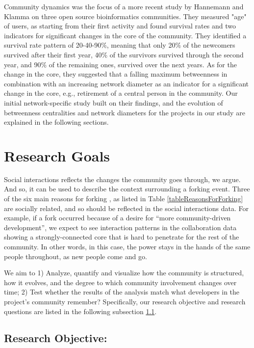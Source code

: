 \documentclass{acm_proc_article-sp}
\begin{document}
Community dynamics was the focus of a more recent study by Hannemann and Klamma \cite{Hannemann} on three open source bioinformatics communities. They measured "age" of users, as starting from their first activity and found survival rates and two indicators for significant changes in the core of the community. They identified a survival rate pattern of 20-40-90\%, meaning that only 20\% of the newcomers survived after their first year, 40\% of the survivors survived through the second year, and 90\% of the remaining ones, survived over the next years. As for the change in the core, they suggested that a falling maximum betweenness in combination with an increasing network diameter as an indicator for a significant change in the core, e.g., retirement of a central person in the community. Our initial network-specific study built on their findings, and the evolution of betweenness centralities and network diameters for the projects in our study are explained in the following sections.


\section{Research Goals}
\label{ResearchGoals}

Social interactions reflects the changes the community goes through, we argue. And so, it can be used to describe the context surrounding a forking event. Three of the six main reasons for forking \cite{Robles}, as listed in Table \ref{tableReasonsForForking} are socially related, and so should be reflected in the social interactions data. For example, if a fork occurred because of a desire for ``more community-driven development'', we expect to see interaction patterns in the collaboration data showing a strongly-connected core that is hard to penetrate for the rest of the community. In other words, in this case, the power stays in the hands of the same people throughout, as new people come and go. 

We aim to 1) Analyze, quantify and visualize how the community is structured, how it evolves, and the degree to which community involvement changes over time; 2) Test whether the results of the analysis match what developers in the project's community remember? 
Specifically, our research objective and research questions are listed in the following subsection \ref{ResearchObjective}.

\subsection{Research Objective:}
\label{ResearchObjective}
\end{document}
